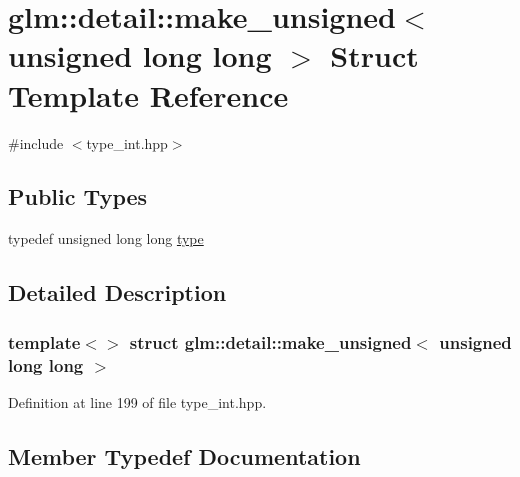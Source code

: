 \hypertarget{structglm_1_1detail_1_1make__unsigned_3_01unsigned_01long_01long_01_4}{}\section{glm\+::detail\+::make\+\_\+unsigned$<$ unsigned long long $>$ Struct Template Reference}
\label{structglm_1_1detail_1_1make__unsigned_3_01unsigned_01long_01long_01_4}


{\ttfamily \#include $<$type\+\_\+int.\+hpp$>$}

\subsection*{Public Types}
\begin{DoxyCompactItemize}
\item 
typedef unsigned long long \mbox{\hyperlink{structglm_1_1detail_1_1make__unsigned_3_01unsigned_01long_01long_01_4_a3f3f1eb1cbdd286e6cb4afb5fa71d5c7}{type}}
\end{DoxyCompactItemize}


\subsection{Detailed Description}
\subsubsection*{template$<$$>$\newline
struct glm\+::detail\+::make\+\_\+unsigned$<$ unsigned long long $>$}



Definition at line 199 of file type\+\_\+int.\+hpp.



\subsection{Member Typedef Documentation}
\mbox{\label{structglm_1_1detail_1_1make__unsigned_3_01unsigned_01long_01long_01_4_a3f3f1eb1cbdd286e6cb4afb5fa71d5c7}} 
